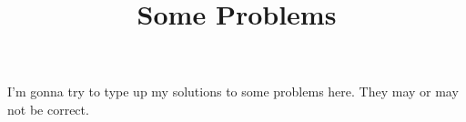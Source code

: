 \documentclass[fontsize=9pt]{article}
\title{Some Problems}
\date{}
\begin{document}
\maketitle
I'm gonna try to type up my solutions to some problems here. They may or may not be correct.
\tableofcontents
    
\end{document}

